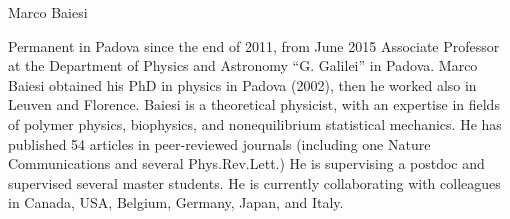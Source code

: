 \begin{participant}[type=PI,PM=12,gender=male]{Marco Baiesi}

  Permanent in Padova since the end of 2011, from June 2015 Associate Professor at the Department of Physics and Astronomy ``G. Galilei'' in Padova.
Marco Baiesi obtained his PhD in physics in Padova (2002), then he worked also in Leuven and Florence. Baiesi is a theoretical physicist, with an expertise in fields of polymer physics, biophysics, and nonequilibrium statistical mechanics.
 He has published 54 articles in peer-reviewed journals (including one Nature Communications and several Phys.Rev.Lett.)
He is supervising a postdoc and supervised several master students.
He is currently collaborating with colleagues in Canada, USA, Belgium, Germany, Japan, and Italy.

\end{participant}


